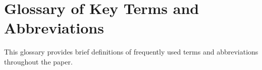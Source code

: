 \documentclass[12pt, reqno]{amsart}
\theoremstyle{definition}
\begin{document}
\maketitle

\tableofcontents










\section*{Glossary of Key Terms and Abbreviations}

This glossary provides brief definitions of frequently used terms and abbreviations throughout the paper.
\end{document}
